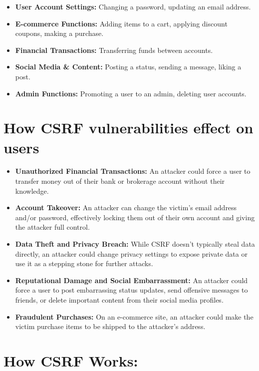 \documentclass{article}
\begin{document}
\begin{itemize}
	\item \textbf{User Account Settings:} Changing a password, updating an email address.        
	\item \textbf{E-commerce Functions:} Adding items to a cart, applying discount coupons, making a purchase.
	\item \textbf{Financial Transactions:} Transferring funds between accounts.
	\item \textbf{Social Media \& Content:} Posting a status, sending a message, liking a post.
	\item \textbf{Admin Functions:} Promoting a user to an admin, deleting user accounts.
\end{itemize}

\section*{How CSRF vulnerabilities effect on users}

\begin{itemize}
    \item \textbf{Unauthorized Financial Transactions:} An attacker could force a user to transfer money out of their bank or brokerage account without their knowledge.
    \item \textbf{Account Takeover:} An attacker can change the victim's email address and/or password, effectively locking them out of their own account and giving the attacker full control.
         
    \item \textbf{Data Theft and Privacy Breach:} While CSRF doesn't typically steal data directly, an attacker could change privacy settings to expose private data or use it as a stepping stone for further attacks.
    \item \textbf{Reputational Damage and Social Embarrassment:} An attacker could force a user to post embarrassing status updates, send offensive messages to friends, or delete important content from their social media profiles.
    \item \textbf{Fraudulent Purchases:} On an e-commerce site, an attacker could make the victim purchase items to be shipped to the attacker's address.
\end{itemize}

\section*{How CSRF Works:}
\end{document}
